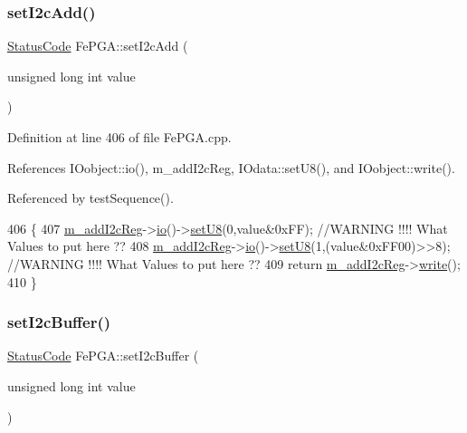 \subsubsection{\texorpdfstring{set\+I2c\+Add()}{setI2cAdd()}}
{\footnotesize\ttfamily \hyperlink{classStatusCode}{Status\+Code} Fe\+P\+G\+A\+::set\+I2c\+Add (\begin{DoxyParamCaption}\item[{unsigned long int}]{value }\end{DoxyParamCaption})}



Definition at line 406 of file Fe\+P\+G\+A.\+cpp.



References I\+Oobject\+::io(), m\+\_\+add\+I2c\+Reg, I\+Odata\+::set\+U8(), and I\+Oobject\+::write().



Referenced by test\+Sequence().


\begin{DoxyCode}
406                                                     \{
407   \hyperlink{classFePGA_af3ef3467ba803e6d3b970ea8982d6246}{m\_addI2cReg}->\hyperlink{classIOobject_af04fb94137c3d86849f478ac5afab5d1}{io}()->\hyperlink{classIOdata_a6c4fb2f2af01889ada889c2b7aceb24d}{setU8}(0,value&0xFF); \textcolor{comment}{//WARNING !!!! What Values to put here ??}
408   \hyperlink{classFePGA_af3ef3467ba803e6d3b970ea8982d6246}{m\_addI2cReg}->\hyperlink{classIOobject_af04fb94137c3d86849f478ac5afab5d1}{io}()->\hyperlink{classIOdata_a6c4fb2f2af01889ada889c2b7aceb24d}{setU8}(1,(value&0xFF00)>>8); \textcolor{comment}{//WARNING !!!! What Values to put here
       ??}
409   \textcolor{keywordflow}{return} \hyperlink{classFePGA_af3ef3467ba803e6d3b970ea8982d6246}{m\_addI2cReg}->\hyperlink{classIOobject_a9f6984bc9f0fadcf800f1be2523ac744}{write}();
410 \}
\end{DoxyCode}
\mbox{\label{classFePGA_aaf52ed549f6b79d53f49c3f85c5fbad2}} 
\subsubsection{\texorpdfstring{set\+I2c\+Buffer()}{setI2cBuffer()}}
{\footnotesize\ttfamily \hyperlink{classStatusCode}{Status\+Code} Fe\+P\+G\+A\+::set\+I2c\+Buffer (\begin{DoxyParamCaption}\item[{unsigned long int}]{value }\end{DoxyParamCaption})}



